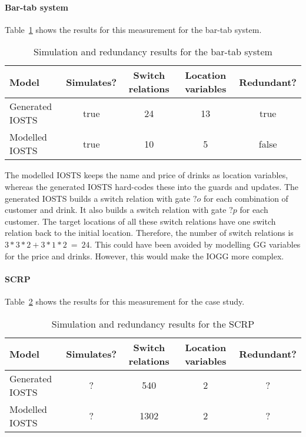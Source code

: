 \paragraph*{Bar-tab system}
Table~\ref{tab:bar-tab-simulate} shows the results for this measurement for the bar-tab system. 

\begin{table}[ht]
\begin{tabular}{|l|c|c|c|c|}
\hline
\textbf{Model} & \textbf{Simulates?} & \textbf{Switch relations} & \textbf{Location variables} & \textbf{Redundant?} \\ \hline
Generated IOSTS & true & 24 & 13 & true \\ \hline
Modelled IOSTS & true & 10 & 5 & false \\ \hline
\end{tabular}
\caption{Simulation and redundancy results for the bar-tab system}
\label{tab:bar-tab-simulate}
\end{table}

The modelled IOSTS keeps the name and price of drinks as location variables, whereas the generated IOSTS hard-codes these into the guards and updates. The generated IOSTS builds a switch relation with gate $?o$ for each combination of customer and drink. It also builds a switch relation with gate $?p$ for each customer. The target locations of all these switch relations have one switch relation back to the initial location. Therefore, the number of switch relations is $3*3*2+3*1*2\: =\: 24$. This could have been avoided by modelling GG variables for the price and drinks. However, this would make the IOGG more complex. 

\paragraph*{SCRP}
Table~\ref{tab:scrp-simulate} shows the results for this measurement for the case study.


\begin{table}[ht]
\begin{center}
\begin{tabular}{|l|c|c|c|c|}
\hline
\textbf{Model} & \textbf{Simulates?} & \textbf{Switch relations} & \textbf{Location variables} & \textbf{Redundant?} \\ \hline
Generated IOSTS & ? & 540 & 2 & ? \\ \hline
Modelled IOSTS & ? & 1302 & 2 & ? \\ \hline
\end{tabular}
\end{center}
\caption{Simulation and redundancy results for the SCRP}
\label{tab:scrp-simulate}
\end{table}

